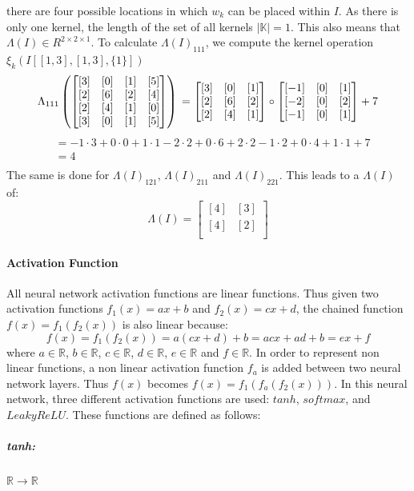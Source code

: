 \documentclass[12pt]{article}
\begin{document}
there are four possible locations in which \(w_k\) can be placed within \(I\). As there is only one kernel, the length of the set of all kernels \(|\mathbb{K}| = 1\). This also means that \(\Lambda(I) \in R^{2 \times 2 \times 1}\). To calculate \(\Lambda(I)_{111}\), we compute the kernel operation \(\xi_k(I[[1,3],[1,3],\{1\}])\)
\begin{equation}
\label{eq:conv:eg}
\Lambda_{111}
\left(\begin{bmatrix}
[3] & [0] & [1] & [5] \\
[2] & [6] & [2] & [4] \\
[2] & [4] & [1] & [0] \\
[3] & [0] & [1] & [5] \\
\end{bmatrix}\right)\\
 = \begin{bmatrix}
[3] & [0] & [1] \\
[2] & [6] & [2] \\
[2] & [4] & [1] \\
\end{bmatrix} \circ 
\begin{bmatrix}
[-1] & [0] & [1] \\
[-2] & [0] & [2] \\
[-1] & [0] & [1]
\end{bmatrix} + 7
\end{equation}
\begin{align*}
&= -1 \cdot 3 + 0 \cdot 0 + 1 \cdot 1 - 2 \cdot 2 + 0 \cdot 6 + 2 \cdot 2 -1 \cdot 2 + 0 \cdot 4 + 1 \cdot 1 + 7\\
&= 4\\
\end{align*}
The same is done for \(\Lambda(I)_{121}\), \(\Lambda(I)_{211}\) and \(\Lambda(I)_{221}\). This leads to a \(\Lambda(I)\) of:
\[
\Lambda(I) = \begin{bmatrix}
[4] & [3] \\
[4] & [2] \\
\end{bmatrix}
\]
\paragraph{Activation Function}
All neural network activation functions are linear functions. Thus given two activation functions \(f_1(x) = ax + b\) and \(f_2(x) = cx + d\), the chained function \(f(x) = f_1(f_2(x))\) is also linear because:
\begin{equation}
\label{eq:proofOfLinearity}
f(x) = f_1(f_2(x)) = a(cx + d) + b = acx + ad + b = ex + f
\end{equation}
where \(a\in\mathbb{R}\), \(b\in\mathbb{R}\), \(c\in\mathbb{R}\), \(d\in\mathbb{R}\), \(e\in\mathbb{R}\) and \(f\in\mathbb{R}\). In order to represent non linear functions, a non linear activation function \(f_a\) is added between two neural network layers. Thus \(f(x)\) becomes \(f(x) = f_1(f_a(f_2(x)))\). In this neural network, three different activation functions are used: \(tanh\), \(softmax\), and \(LeakyReLU\). These functions are defined as follows:
\subparagraph{tanh:}\(\mathbb{R}\to \mathbb{R}\)
\end{document}
